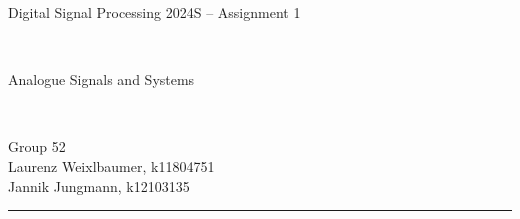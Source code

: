 \documentclass[12pt,a4paper,english]{article}
\begin{document}
\pagestyle{plain}

\thispagestyle{empty}
\noindent
\begin{minipage}[b][4cm]{1.0\textwidth}
    \begin{center}
        \begin{bf}
            \begin{large}
                Digital Signal Processing 2024S -- Assignment 1
            \end{large} \\
            \vspace{0.3cm}
            \begin{Large}
                Analogue Signals and Systems
            \end{Large} \\
            \vspace{0.3cm}
        \end{bf}
        \begin{large}
            Group 52\\
            Laurenz Weixlbaumer, k11804751\\
            Jannik Jungmann, k12103135\\
        \end{large}
    \end{center}
\end{minipage}

\noindent \rule[0.8em]{\textwidth}{0.12mm}\\[-0.5em]
\end{document}
